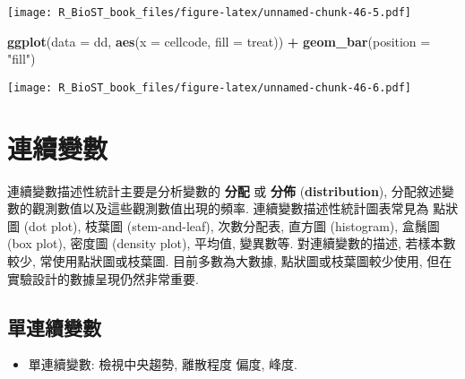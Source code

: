 \documentclass[
]{book}
\newenvironment{Shaded}{\begin{snugshade}}{\end{snugshade}}
\newcommand{\CommentTok}[1]{\textcolor[rgb]{0.56,0.35,0.01}{\textit{#1}}}
\newcommand{\DataTypeTok}[1]{\textcolor[rgb]{0.13,0.29,0.53}{#1}}
\newcommand{\KeywordTok}[1]{\textcolor[rgb]{0.13,0.29,0.53}{\textbf{#1}}}
\newcommand{\NormalTok}[1]{#1}
\newcommand{\OperatorTok}[1]{\textcolor[rgb]{0.81,0.36,0.00}{\textbf{#1}}}
\newcommand{\OtherTok}[1]{\textcolor[rgb]{0.56,0.35,0.01}{#1}}
\newcommand{\StringTok}[1]{\textcolor[rgb]{0.31,0.60,0.02}{#1}}
\providecommand{\tightlist}{%
  \setlength{\itemsep}{0pt}\setlength{\parskip}{0pt}}
\begin{document}
\texttt{[image: R\_BioST\_book\_files/figure-latex/unnamed-chunk-46-5.pdf]}

\begin{Shaded}
\begin{Highlighting}[]
\KeywordTok{ggplot}\NormalTok{(}\DataTypeTok{data =}\NormalTok{ dd, }\KeywordTok{aes}\NormalTok{(}\DataTypeTok{x =}\NormalTok{ cellcode, }\DataTypeTok{fill =}\NormalTok{ treat)) }\OperatorTok{+}\StringTok{ }
\StringTok{  }\KeywordTok{geom\_bar}\NormalTok{(}\DataTypeTok{position =} \StringTok{"fill"}\NormalTok{)}
\end{Highlighting}
\end{Shaded}

\texttt{[image: R\_BioST\_book\_files/figure-latex/unnamed-chunk-46-6.pdf]}

\hypertarget{ux9023ux7e8cux8b8aux6578}{%
\section{連續變數}\label{ux9023ux7e8cux8b8aux6578}}

連續變數描述性統計主要是分析變數的
\textbf{分配}
或
\textbf{分佈}
(\textbf{distribution}),
分配敘述變數的觀測數值以及這些觀測數值出現的頻率.
連續變數描述性統計圖表常見為
點狀圖 (dot plot), 枝葉圖 (stem-and-leaf),
次數分配表, 直方圖 (histogram), 盒鬚圖 (box plot),
密度圖 (density plot), 平均值, 變異數等.
對連續變數的描述, 若樣本數較少,
常使用點狀圖或枝葉圖.
目前多數為大數據, 點狀圖或枝葉圖較少使用,
但在實驗設計的數據呈現仍然非常重要.

\hypertarget{ux55aeux9023ux7e8cux8b8aux6578}{%
\subsection{單連續變數}\label{ux55aeux9023ux7e8cux8b8aux6578}}

\begin{itemize}
\tightlist
\item
  單連續變數: 檢視中央趨勢, 離散程度 偏度, 峰度.
\end{itemize}

\begin{Shaded}
\end{Shaded}
\end{document}
